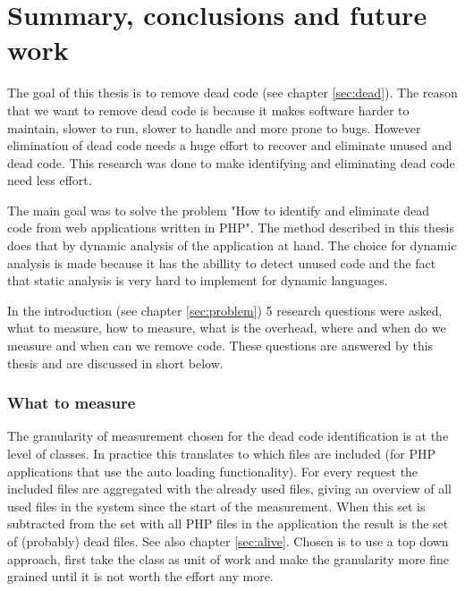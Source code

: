 \chapter{Summary, conclusions and future work\label{ch:conclusions}\label{ch:future}}

The goal of this thesis is to remove dead code (see chapter \ref{sec:dead}). The reason that we want to remove dead code is because it makes software harder to maintain, slower to run, slower to handle and more prone to bugs\cite{chen1998,godfrey2000,huang2003,kiewkanya2005,scanniello2011}. However elimination of dead code needs a huge effort to recover and eliminate unused and dead code\cite{andreopoulos2004,jones2006,scanniello2011}. This research was done to make identifying and eliminating dead code need less effort.

The main goal was to solve the problem "How to identify and eliminate dead code from web applications written in PHP". The method described in this thesis does that by dynamic analysis of the application at hand. The choice for dynamic analysis is made because it has the abillity to detect unused code and the fact that static analysis is very hard to implement for dynamic languages\cite{biggar2009,biggar2009draft,biggar2010,devries2007,tratt2009}. 

In the introduction (see chapter \ref{sec:problem}) 5 research questions were asked, what to measure, how to measure, what is the overhead, where and when do we measure and when can we remove code. These questions are answered by this thesis and are discussed in short below.

\subsection*{What to measure}
The granularity of measurement chosen for the dead code identification is at the level of classes. In practice this translates to which files are included (for PHP applications that use the auto loading functionality). For every request the included files are aggregated with the already used files, giving an overview of all used files in the system since the start of the measurement. When this set is subtracted from the set with all PHP files in the application the result is the set of (probably) dead files. See also chapter \ref{sec:alive}. Chosen is to use a top down approach, first take the class as unit of work and make the granularity more fine grained until it is not worth the effort any more. 


